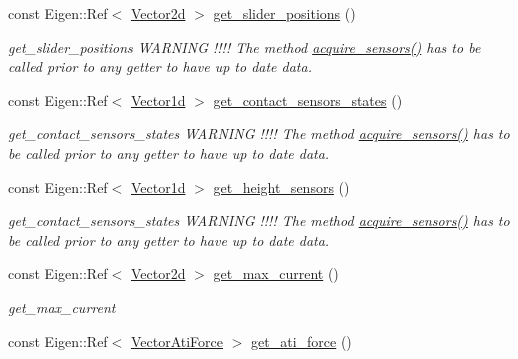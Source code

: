 \begin{DoxyCompactItemize}
const Eigen\+::\+Ref$<$ \hyperlink{common__header_8hpp_acb6916bc8c9fe9d98c484fd4cc201447}{Vector2d} $>$ \hyperlink{classblmc__robots_1_1Teststand_af46acfc1bd408d40b850c4780e834f53}{get\+\_\+slider\+\_\+positions} ()
\begin{DoxyCompactList}\small\item\em get\+\_\+slider\+\_\+positions W\+A\+R\+N\+I\+NG !!!! The method \hyperlink{classblmc__robots_1_1Teststand_a4203e25148ab5b4ddfef3b46647213c6}{acquire\+\_\+sensors()} has to be called prior to any getter to have up to date data. \end{DoxyCompactList}\item 
const Eigen\+::\+Ref$<$ \hyperlink{common__header_8hpp_a932c1319d78144ebcaa8938ae070b784}{Vector1d} $>$ \hyperlink{classblmc__robots_1_1Teststand_a0486afbd05d4f7c354ebad8432c178bd}{get\+\_\+contact\+\_\+sensors\+\_\+states} ()
\begin{DoxyCompactList}\small\item\em get\+\_\+contact\+\_\+sensors\+\_\+states W\+A\+R\+N\+I\+NG !!!! The method \hyperlink{classblmc__robots_1_1Teststand_a4203e25148ab5b4ddfef3b46647213c6}{acquire\+\_\+sensors()} has to be called prior to any getter to have up to date data. \end{DoxyCompactList}\item 
const Eigen\+::\+Ref$<$ \hyperlink{common__header_8hpp_a932c1319d78144ebcaa8938ae070b784}{Vector1d} $>$ \hyperlink{classblmc__robots_1_1Teststand_af8a0d1cc608f91a0a752758c7554087a}{get\+\_\+height\+\_\+sensors} ()
\begin{DoxyCompactList}\small\item\em get\+\_\+contact\+\_\+sensors\+\_\+states W\+A\+R\+N\+I\+NG !!!! The method \hyperlink{classblmc__robots_1_1Teststand_a4203e25148ab5b4ddfef3b46647213c6}{acquire\+\_\+sensors()} has to be called prior to any getter to have up to date data. \end{DoxyCompactList}\item 
const Eigen\+::\+Ref$<$ \hyperlink{common__header_8hpp_acb6916bc8c9fe9d98c484fd4cc201447}{Vector2d} $>$ \hyperlink{classblmc__robots_1_1Teststand_a2f912631ee055e3909ef1a5e06d8d27c}{get\+\_\+max\+\_\+current} ()
\begin{DoxyCompactList}\small\item\em get\+\_\+max\+\_\+current \end{DoxyCompactList}\item 
const Eigen\+::\+Ref$<$ \hyperlink{classblmc__robots_1_1Teststand_a51f17cf2b01dd8252e21db97b486e067}{Vector\+Ati\+Force} $>$ \hyperlink{classblmc__robots_1_1Teststand_af4bf3a4692fdeacdad78a7213c3fbe98}{get\+\_\+ati\+\_\+force} ()

\end{DoxyCompactItemize}
